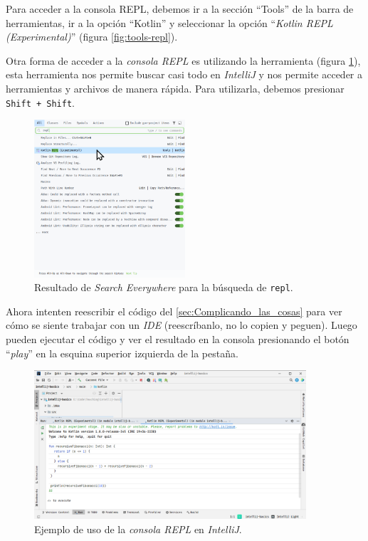     Para acceder a la consola REPL, debemos ir a la sección \enquote{Tools} de la barra de 
    herramientas, ir a la opción \enquote{Kotlin} y seleccionar la opción \enquote{\textit{Kotlin REPL 
    (Experimental)}} (figura \ref{fig:tools-repl}).
    
    \begin{tcolorbox}[enhanced, breakable, title=\textit{Search Everywere}]
      Otra forma de acceder a la \textit{consola REPL} es utilizando la herramienta  (figura \ref{fig:idea64-search-everywhere}), esta herramienta nos permite buscar
      casi todo en \textit{IntelliJ} y nos permite acceder a herramientas y archivos de manera 
      rápida.
      Para utilizarla, debemos presionar \texttt{Shift + Shift}.
    \end{tcolorbox}
    
    \begin{figure}[ht!]
      \centering
      \includegraphics[width=0.5\textwidth]{img/Por_algo_se_empieza/idea64_search_everywhere.png}
      \caption{Resultado de \textit{Search Everywhere} para la búsqueda de \texttt{repl}.}
      \label{fig:idea64-search-everywhere}
    \end{figure}

    Ahora intenten reescribir el código del \cref{sec:Complicando_las_cosas} para ver cómo se siente 
    trabajar con un \textit{IDE} (reescríbanlo, no lo copien y peguen).
    Luego pueden ejecutar el código y ver el resultado en la consola presionando el botón 
    \enquote{\textit{play}} en la esquina superior izquierda de la pestaña.
    
    \begin{figure}[ht!]
      \centering
      \includegraphics[width=0.9\textwidth]{img/Por_algo_se_empieza/idea64_fibonacci_repl.png}
      \caption{Ejemplo de uso de la \textit{consola REPL} en \textit{IntelliJ}.}
      \label{fig:idea64-fibonacci-repl}
    \end{figure}
